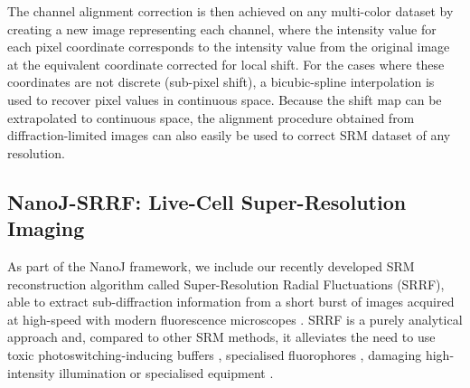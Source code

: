  The channel alignment correction is then achieved on any multi-color dataset by creating a new image representing each channel, where the intensity value for each pixel coordinate corresponds to the intensity value from the original image at the equivalent coordinate corrected for local shift. For the cases where these coordinates are not discrete (sub-pixel shift), a bicubic-spline interpolation is used to recover pixel values in continuous space. Because the shift map can be extrapolated to continuous space, the alignment procedure obtained from diffraction-limited images can also easily be used to correct SRM dataset of any resolution. 
 
\subsection*{NanoJ-SRRF: Live-Cell Super-Resolution Imaging}
 As part of the NanoJ framework, we include our recently developed SRM reconstruction algorithm called Super-Resolution Radial Fluctuations (SRRF), able to extract sub-diffraction information from a short burst of images acquired at high-speed with modern fluorescence microscopes \cite{gustafsson2016fast,culley2018srrf}. SRRF is a purely analytical approach and, compared to other SRM methods, it alleviates the need to use toxic photoswitching-inducing buffers \cite{henriques2011palm}, specialised fluorophores \cite{dempsey2011evaluation,henriques2009palm}, damaging high-intensity illumination \cite{waldchen2015light} or specialised equipment \cite{gustafsson2000surpassing,hell1994breaking}.
 
